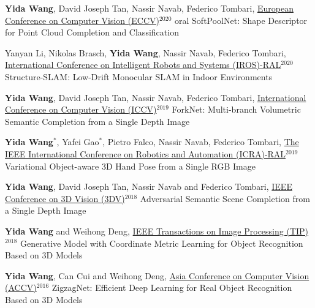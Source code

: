 \begin{cventries}
\begin{enumerate}[label={[\arabic*]}, leftmargin=*]
\item 
\cvpublication
{\textbf{Yida Wang}, David Joseph Tan, Nassir Navab, Federico Tombari, \underline{European Conference on Computer Vision (ECCV)}$^{2020}$ oral \href{https://www.youtube.com/watch?v=zw4NlyxWlBg}{}} %
{SoftPoolNet: Shape Descriptor for Point Cloud Completion and Classification} %
{} %
{} %

\item 
\cvpublication
{Yanyan Li, Nikolas Brasch, \textbf{Yida Wang}, Nassir Navab, Federico Tombari, \underline{International Conference on Intelligent Robots and Systems (IROS)-RAL}$^{ 2020}$} %
{Structure-SLAM: Low-Drift Monocular SLAM in Indoor Environments} %
{} %
{} %

\item 
\cvpublication
{\textbf{Yida Wang}, David Joseph Tan, Nassir Navab, Federico Tombari, \underline{International Conference on Computer Vision (ICCV)}$^{2019}$} %
{ForkNet: Multi-branch Volumetric Semantic Completion from a Single Depth Image} %
{} %
{} %

\item 
\cvpublication
{\textbf{Yida Wang}$^*$, Yafei Gao$^*$, Pietro Falco, Nassir Navab, Federico Tombari, \underline{The IEEE International Conference on Robotics and Automation (ICRA)-RAL}$^{2019}$ \href{https://www.youtube.com/watch?v=tSTQ2NTqB4A}{}} %
{Variational Object-aware 3D Hand Pose from a Single RGB Image} %
{} %
{} %

\item 
\cvpublication
{\textbf{Yida Wang}, David Joseph Tan, Nassir Navab and Federico Tombari, \underline{IEEE Conference on 3D Vision (3DV)}$^{2018}$ \href{https://www.youtube.com/watch?v=udvBhkupwXE&t=1s}{}} %
{Adversarial Semantic Scene Completion from a Single Depth Image} %
{} %
{} %


\item 
\cvpublication
{\textbf{Yida Wang} and Weihong Deng, \underline{IEEE Transactions on Image Processing (TIP)}$^{2018}$} %
{Generative Model with Coordinate Metric Learning for Object Recognition Based on 3D Models} %
{} %
{} %


\item 
\cvpublication
{\textbf{Yida Wang}, Can Cui and Weihong Deng, \underline{Asia Conference on Computer Vision (ACCV)}$^{2016}$} %
{ZigzagNet: Efficient Deep Learning for Real Object Recognition Based on 3D Models} %
{} %
{} %


\end{enumerate}
\end{cventries}
